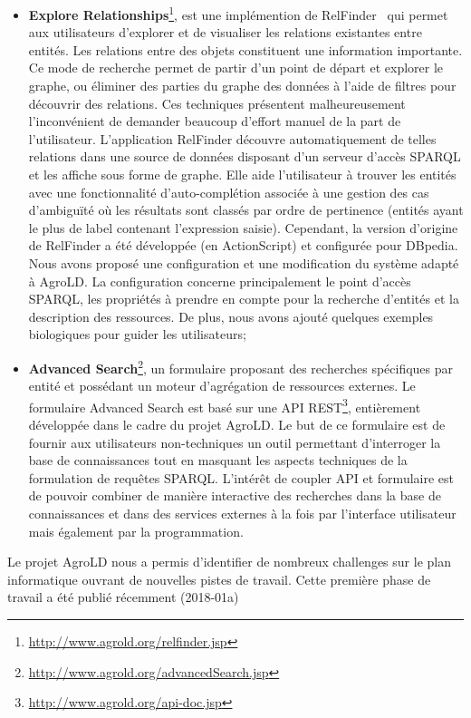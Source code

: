 \begin{itemize}
\item \textbf{Explore Relationships}\footnote{\url{http://www.agrold.org/relfinder.jsp}}, est une implémention de RelFinder~\cite{relfinder} qui permet aux utilisateurs d’explorer et de visualiser les relations existantes entre entités. Les relations entre des objets constituent une information importante. Ce mode de recherche permet de partir d’un point de départ et explorer le graphe, ou éliminer des parties du graphe des données à l’aide de filtres pour découvrir des relations. Ces techniques présentent malheureusement l’inconvénient de demander beaucoup d’effort manuel de la part de l’utilisateur. L’application RelFinder découvre automatiquement de telles relations dans une source de données disposant d’un serveur d’accès SPARQL et les affiche sous forme de graphe. Elle aide l’utilisateur à trouver les entités avec une fonctionnalité d’auto-complétion associée à une gestion des cas d’ambiguïté où les résultats sont classés par ordre de pertinence (entités ayant le plus de label contenant l’expression saisie). Cependant, la version d'origine de RelFinder a été développée (en ActionScript) et configurée pour DBpedia. Nous avons proposé une configuration et une modification du système adapté à AgroLD. La configuration concerne principalement le point d’accès SPARQL, les propriétés à prendre en compte pour la recherche d’entités et la description des ressources. De plus, nous avons ajouté quelques exemples biologiques pour guider les utilisateurs;\\
\item \textbf{Advanced Search}\footnote{\url{http://www.agrold.org/advancedSearch.jsp}}, un formulaire proposant des recherches spécifiques par entité et possédant un moteur d'agrégation de ressources externes. Le formulaire Advanced Search est basé sur une API REST\footnote{\url{http://www.agrold.org/api-doc.jsp}}, entièrement développée dans le cadre du projet AgroLD. Le but de ce formulaire est de fournir aux utilisateurs non-techniques un outil permettant d’interroger la base de connaissances tout en masquant les aspects techniques de la formulation de requêtes SPARQL. L'intérêt de coupler API et formulaire est de pouvoir combiner de manière interactive des recherches dans la base de connaissances et dans des services externes à la fois par l'interface utilisateur mais également par la programmation.\\

\end{itemize}

Le projet AgroLD nous a permis d’identifier de nombreux challenges sur le plan informatique ouvrant de nouvelles pistes de travail. Cette première phase de travail a été publié récemment (2018-01a)\\

